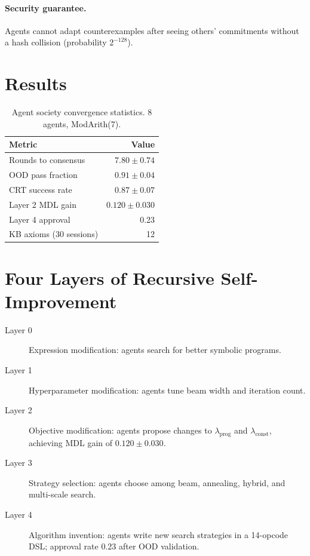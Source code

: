 \documentclass{article}
\begin{document}
\paragraph{Security guarantee.}
Agents cannot adapt counterexamples after seeing others' commitments
without a hash collision (probability $2^{-128}$).

\section{Results}

\begin{table}[h]
\centering
\caption{Agent society convergence statistics. 8 agents, ModArith(7).}
\label{tab:convergence}
\begin{tabular}{lr}
\toprule
Metric & Value \\
\midrule
Rounds to consensus & $7.80 \pm 0.74$ \\
OOD pass fraction   & $0.91 \pm 0.04$ \\
CRT success rate    & $0.87 \pm 0.07$ \\
Layer 2 MDL gain    & $0.120 \pm 0.030$ \\
Layer 4 approval    & 0.23 \\
KB axioms (30 sessions) & 12 \\
\bottomrule
\end{tabular}
\end{table}

\section{Four Layers of Recursive Self-Improvement}

\begin{description}
  \item[Layer 0] Expression modification: agents search for better symbolic programs.
  \item[Layer 1] Hyperparameter modification: agents tune beam width and iteration count.
  \item[Layer 2] Objective modification: agents propose changes to $\lambda_{\text{prog}}$
        and $\lambda_{\text{const}}$, achieving MDL gain of
        $0.120 \pm 0.030$.
  \item[Layer 3] Strategy selection: agents choose among beam, annealing, hybrid,
        and multi-scale search.
  \item[Layer 4] Algorithm invention: agents write new search strategies in a
        14-opcode DSL; approval rate 0.23 after OOD validation.
\end{description}
\end{document}
